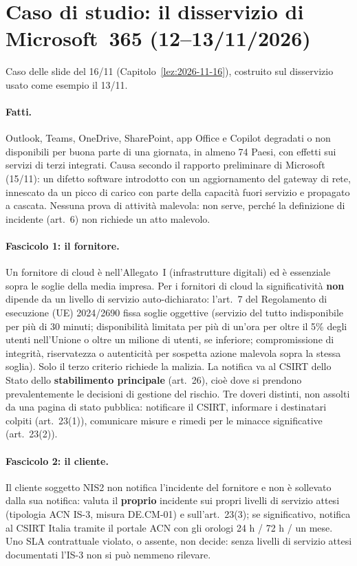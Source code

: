\section{Caso di studio: il disservizio di Microsoft~365 (12--13/11/2026)}
\label{sec:nis2-caso-microsoft}

Caso delle slide del 16/11 (Capitolo~\ref{lez:2026-11-16}), costruito sul disservizio usato come esempio
il 13/11.

\paragraph{Fatti.} Outlook, Teams, OneDrive, SharePoint, app Office e Copilot degradati o non
disponibili per buona parte di una giornata, in almeno 74 Paesi, con effetti sui servizi di terzi
integrati. Causa secondo il rapporto preliminare di Microsoft (15/11): un difetto software introdotto
con un aggiornamento del gateway di rete, innescato da un picco di carico con parte della capacità fuori
servizio e propagato a cascata. Nessuna prova di attività malevola: non serve, perché la definizione di
incidente (art.~6) non richiede un atto malevolo.

\paragraph{Fascicolo 1: il fornitore.} Un fornitore di cloud è nell'Allegato~I (infrastrutture
digitali) ed è essenziale sopra le soglie della media impresa. Per i fornitori di cloud la
significatività \textbf{non} dipende da un livello di servizio auto-dichiarato: l'art.~7 del Regolamento
di esecuzione (UE) 2024/2690 fissa soglie oggettive (servizio del tutto indisponibile per più di 30
minuti; disponibilità limitata per più di un'ora per oltre il 5\% degli utenti nell'Unione o oltre un
milione di utenti, se inferiore; compromissione di integrità, riservatezza o autenticità per sospetta
azione malevola sopra la stessa soglia). Solo il terzo criterio richiede la malizia. La notifica va al
CSIRT dello Stato dello \textbf{stabilimento principale} (art.~26), cioè dove si prendono
prevalentemente le decisioni di gestione del rischio. Tre doveri distinti, non assolti da una pagina di
stato pubblica: notificare il CSIRT, informare i destinatari colpiti (art.~23(1)), comunicare misure e
rimedi per le minacce significative (art.~23(2)).

\paragraph{Fascicolo 2: il cliente.} Il cliente soggetto NIS2 non notifica l'incidente del fornitore e
non è sollevato dalla sua notifica: valuta il \textbf{proprio} incidente sui propri livelli di servizio
attesi (tipologia ACN IS-3, misura DE.CM-01) e sull'art.~23(3); se significativo, notifica al CSIRT
Italia tramite il portale ACN con gli orologi 24 h / 72 h / un mese. Uno SLA contrattuale violato, o
assente, non decide: senza livelli di servizio attesi documentati l'IS-3 non si può nemmeno rilevare.

